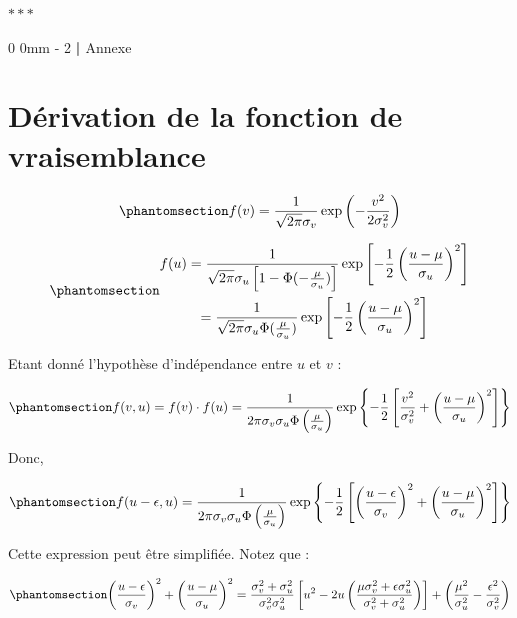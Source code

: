 \documentclass[
  12pt,
]{report}
\makeatletter
\newcommand{\macrostars}{
    \vspace{2em}
    \begin{center}
        \textcolor{highlight!80!black}{\Large{$\ast\ast\ast$}}
    \end{center}
}
\renewcommand{\chapter}{%
    \clearpage %
    \@startsection{chapter}%
    {0} %
    {0mm} %
    {-\baselineskip} %
    {2\baselineskip} %
    {\normalfont\Huge\bfseries | \Huge\bfseries}%
}
\makeatother
\begin{document}
\macrostars

\chapter{Annexe}\label{annexe}

\section{Dérivation de la fonction de
vraisemblance}\label{duxe9rivation-de-la-fonction-de-vraisemblance}

\begin{equation}\phantomsection\label{eq-fv}{
f(v) = \frac{1}{\sqrt{2\pi}\sigma_v}\exp{\left(-\frac{v^2}{2\sigma^2_v} \right)}
}\end{equation}

\begin{equation}\phantomsection\label{eq-fu}{
\begin{gathered}
f(u) = \frac{1}{\sqrt{2\pi}\sigma_u\left[1-\Phi(-\frac{\mu}{\sigma_u})\right]}\exp\left[-\frac{1}{2}\left(\frac{u-\mu}{\sigma_u}\right)^2 \right]\\
= \frac{1}{\sqrt{2\pi}\sigma_u\Phi(\frac{\mu}{\sigma_u})}\exp\left[-\frac{1}{2}\left(\frac{u-\mu}{\sigma_u}\right)^2 \right]
\end{gathered}
}\end{equation}

Etant donné l'hypothèse d'indépendance entre \(u\) et \(v\) :

\begin{equation}\phantomsection\label{eq-fv-fu}{
f(v,u) = f(v) \cdot f(u) = \frac{1}{2\pi\sigma_v\sigma_u\Phi\left(\frac{\mu}{\sigma_u}\right)}\exp\left\{-\frac{1}{2}\left[\frac{v^2}{\sigma^2_v} + \left(\frac{u-\mu}{\sigma_u}\right)^2\right] \right\}
}\end{equation}

Donc,

\begin{equation}\phantomsection\label{eq-fepsilon}{
f(u-\epsilon, u) = \frac{1}{2\pi\sigma_v\sigma_u\Phi\left(\frac{\mu}{\sigma_u}\right)}\exp\left\{-\frac{1}{2}\left[\left(\frac{u-\epsilon}{\sigma_v}\right)^2 + \left(\frac{u-\mu}{\sigma_u}\right)^2\right] \right\}
}\end{equation}

Cette expression peut être simplifiée. Notez que :

\begin{equation}\phantomsection\label{eq-fepsilon-2}{
\left(\frac{u-\epsilon}{\sigma_v}\right)^2 + \left(\frac{u-\mu}{\sigma_u}\right)^2 = \frac{\sigma^2_v + \sigma^2_u}{\sigma^2_v\sigma^2_u}\left[u^2 - 2u \left( \frac{\mu\sigma^2_v+\epsilon\sigma^2_u}{\sigma^2_v+\sigma^2_u}\right)\right] + \left(\frac{\mu^2}{\sigma^2_u}-\frac{\epsilon^2}{\sigma^2_v}\right)
}\end{equation}
\end{document}
